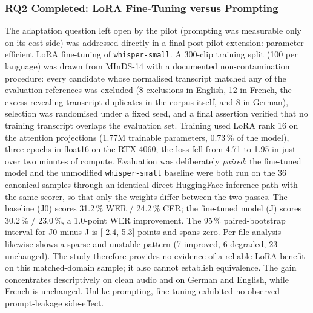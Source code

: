 \documentclass[12pt]{report}
\begin{document}
\subsubsection{RQ2 Completed: LoRA Fine-Tuning versus Prompting}
The adaptation question left open by the pilot (prompting was measurable only on its cost side) was addressed directly in a final post-pilot extension: parameter-efficient LoRA fine-tuning of \texttt{whisper-small}. A 300-clip training split (100 per language) was drawn from MInDS-14 with a documented non-contamination procedure: every candidate whose normalised transcript matched any of the evaluation references was excluded (8 exclusions in English, 12 in French, the excess revealing transcript duplicates in the corpus itself, and 8 in German), selection was randomised under a fixed seed, and a final assertion verified that no training transcript overlaps the evaluation set. Training used LoRA rank 16 on the attention projections (1.77M trainable parameters, 0.73\,\% of the model), three epochs in float16 on the RTX 4060; the loss fell from 4.71 to 1.95 in just over two minutes of compute.
Evaluation was deliberately \emph{paired}: the fine-tuned model and the unmodified \texttt{whisper-small} baseline were both run on the 36 canonical samples through an identical direct HuggingFace inference path with the same scorer, so that only the weights differ between the two passes. The baseline (J0) scores 31.2\,\% WER / 24.2\,\% CER; the fine-tuned model (J) scores 30.2\,\% / 23.0\,\%, a 1.0-point WER improvement. The 95\,\% paired-bootstrap interval for J0 minus J is [-2.4, 5.3] points and spans zero. Per-file analysis likewise shows a sparse and unstable pattern (7 improved, 6 degraded, 23 unchanged). The study therefore provides no evidence of a reliable LoRA benefit on this matched-domain sample; it also cannot establish equivalence. The gain concentrates descriptively on clean audio and on German and English, while French is unchanged. Unlike prompting, fine-tuning exhibited no observed prompt-leakage side-effect.
\end{document}
